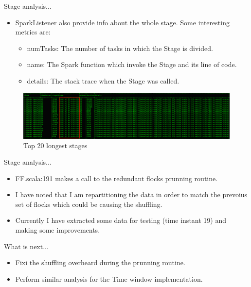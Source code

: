 \documentclass{beamer}
\begin{document}
\begin{frame}{Stage analysis...}
    \begin{itemize}
        \item SparkListener also provide info about the whole stage.  Some interesting metrics are:
        \begin{itemize}
            \item numTasks: The number of tasks in which the Stage is divided.
            \item name: The Spark function which invoke the Stage and its line of code.
            \item details: The stack trace when the Stage was called.
        \end{itemize}
    \end{itemize}

    \begin{figure}
        \includegraphics[width=1\textwidth]{figures/StageAnalysisFF1}
        \caption{\small Top 20 longest stages}
    \end{figure}
\end{frame}

\begin{frame}{Stage analysis...}
    \begin{itemize}
        \item FF.scala:191 makes a call to the redundant flocks prunning routine.
        \item I have noted that I am repartitioning the data in order to match the prevoius set of flocks which could be causing the shuffling.
        \item Currently I have extracted some data for testing (time instant 19) and making some improvements.
    \end{itemize}
\end{frame}

\begin{frame}{What is next...}
    \begin{itemize}
        \item Fixi the shuffling overheard during the prunning routine.
        \item Perform similar analysis for the Time window implementation.
    \end{itemize}
\end{frame}
\end{document}
